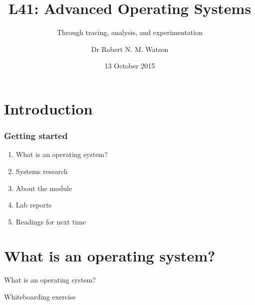 
{
}

\usepackage[english]{babel}
\usepackage[latin1]{inputenc}
\usepackage{graphicx}
\usepackage{times}
\usepackage[T1]{fontenc}
\usepackage{fancyvrb}
\usepackage{listings}


\title{L41: Advanced Operating Systems}
\subtitle{Through tracing, analysis, and experimentation}
\author{Dr Robert N. M. Watson}
\date{13 October 2015}

\begin{frame}
  \titlepage
\end{frame}

\section{Introduction}

\begin{frame}
  \frametitle{Getting started}

  \begin{enumerate}
    \item What is an operating system?
    \item Systems research
    \item About the module
    \item Lab reports
    \item Readings for next time
  \end{enumerate}
\end{frame}

\section{What is an operating system?}

%
%

\begin{frame}
  \begin{huge}
  \begin{center}
    What is an operating system?
  \end{center}
  \end{huge}

  \bigskip

  \begin{center}
  \begin{tiny}
    Whiteboarding exercise
  \end{tiny}
  \end{center}
\end{frame}

